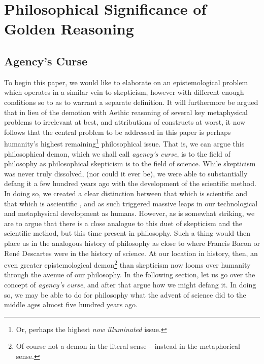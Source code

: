 \section{Philosophical Significance of Golden Reasoning}

\subsection{Agency's Curse}

To begin this paper, we would like to elaborate on an epistemological problem which operates in a similar vein to skepticism, however with different enough conditions so to as to warrant a separate definition. It will furthermore be argued that in lieu of the demotion with Aethic reasoning \cite{Aethus} of several key metaphysical problems to irrelevant at best, and attributions of constructs at worst, it now follows that the central problem to be addressed in this paper is perhaps humanity's highest remaining\footnote{Or, perhaps the highest \textit{now illuminated} issue.} philosophical issue. That is, we can argue this philosophical demon, which we shall call \textit{agency's curse}, is to the field of philosophy as philosophical skepticism is to the field of science. While skepticism was never truly dissolved, (nor could it ever be), we were able to substantially defang it a few hundred years ago with the development of the scientific method. In doing so, we created a clear distinction between that which is scientific and that which is ascientific \cite{}, and as such triggered massive leaps in our technological and metaphysical development as humans. However, as is somewhat striking, we are to argue that there is a close analogue to this duet of skepticism and the scientific method, but this time present in philosophy. Such a thing would then place us in the analogous history of philosophy as close to where Francis Bacon or René Descartes were in the history of science. At our location in history, then, an even greater epistemological demon\footnote{Of course not a demon in the literal sense -- instead in the metaphorical sense.} than skepticism now looms over humanity through the avenue of our philosophy. In the following section, let us go over the concept of \textit{agency's curse}, and after that argue how we might defang it. In doing so, we may be able to do for philosophy what the advent of science did to the middle ages almost five hundred years ago. 

